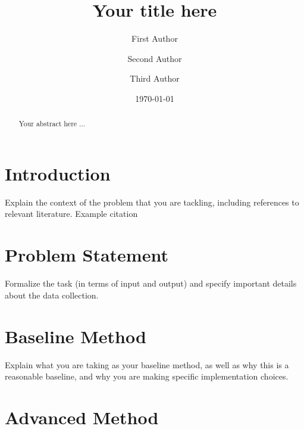 \documentclass[sigconf]{acmart}
\begin{document}
\title{Your title here}

\author{First Author}
\affiliation{}

\author{Second Author}
\affiliation{}

\author{Third Author}
\affiliation{}

\date{\today}



\begin{abstract}
Your abstract here ...
\end{abstract}


\renewcommand\footnotetextcopyrightpermission[1]{}
\pagestyle{plain}

\maketitle


\section{Introduction}

Explain the context of the problem that you are tackling, including references to relevant literature.
%
Example citation~\citep{Balog:2012:CIKM}

\section{Problem Statement}

Formalize the task (in terms of input and output) and specify important details about the data collection.


\section{Baseline Method}

Explain what you are taking as your baseline method, as well as why this is a reasonable baseline, and why you are making specific implementation choices.

\section{Advanced Method}
\end{document}
